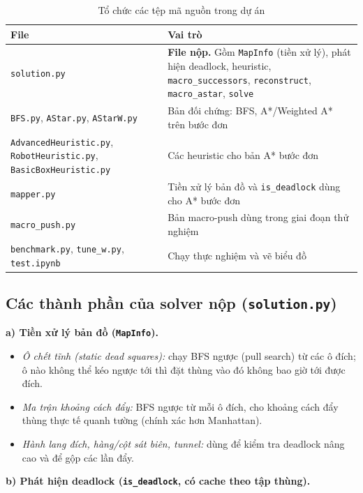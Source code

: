 \documentclass[a4paper,12pt]{article}
\begin{document}
\begin{table}[H]
\centering
\begin{tabularx}{\textwidth}{lX}
\toprule
\textbf{File} & \textbf{Vai trò} \\
\midrule
\texttt{solution.py} & \textbf{File nộp.} Gồm \texttt{MapInfo} (tiền xử lý), phát hiện deadlock, heuristic, \texttt{macro\_successors}, \texttt{reconstruct}, \texttt{macro\_astar}, \texttt{solve} \\
\texttt{BFS.py}, \texttt{AStar.py}, \texttt{AStarW.py} & Bản đối chứng: BFS, A*/Weighted A* trên bước đơn \\
\texttt{AdvancedHeuristic.py}, \texttt{RobotHeuristic.py}, \texttt{BasicBoxHeuristic.py} & Các heuristic cho bản A* bước đơn \\
\texttt{mapper.py} & Tiền xử lý bản đồ và \texttt{is\_deadlock} dùng cho A* bước đơn \\
\texttt{macro\_push.py} & Bản macro-push dùng trong giai đoạn thử nghiệm \\
\texttt{benchmark.py}, \texttt{tune\_w.py}, \texttt{test.ipynb} & Chạy thực nghiệm và vẽ biểu đồ \\
\bottomrule
\end{tabularx}
\caption{Tổ chức các tệp mã nguồn trong dự án}
\end{table}

\subsection{Các thành phần của solver nộp (\texttt{solution.py})}

\textbf{a) Tiền xử lý bản đồ (\texttt{MapInfo}).}
\begin{itemize}
    \item \textit{Ô chết tĩnh (static dead squares):} chạy BFS ngược (pull search) từ các ô đích; ô nào không thể kéo ngược tới thì đặt thùng vào đó không bao giờ tới được đích.
    \item \textit{Ma trận khoảng cách đẩy:} BFS ngược từ mỗi ô đích, cho khoảng cách đẩy thùng thực tế quanh tường (chính xác hơn Manhattan).
    \item \textit{Hành lang đích, hàng/cột sát biên, tunnel:} dùng để kiểm tra deadlock nâng cao và để gộp các lần đẩy.
\end{itemize}

\textbf{b) Phát hiện deadlock (\texttt{is\_deadlock}, có cache theo tập thùng).}
\end{document}
